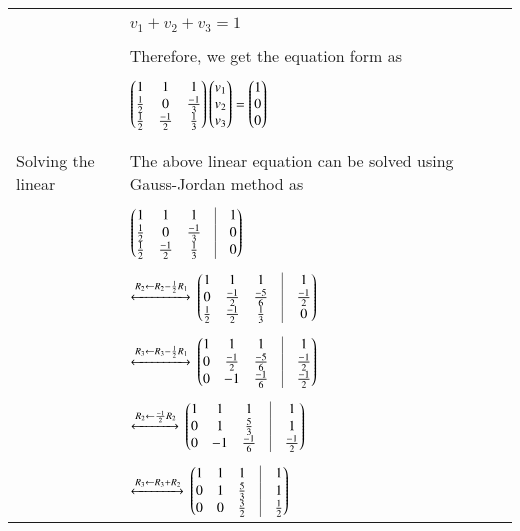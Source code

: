 \begin{longtable}{|l|l|}
		& \\
		& \qquad \qquad \qquad $v_{1}+v_{2}+v_{3} = 1$ \\
		& \\
		& Therefore, we get the equation form as \\
		& \\
		& \qquad \qquad \qquad $\begin{pmatrix}1&1&1\\\frac{1}{2}&0&\frac{-1}{3}\\\frac{1}{2}&\frac{-1}{2}&\frac{1}{3}\end{pmatrix}\begin{pmatrix}v_{1}\\v_{2}\\v_{3}\end{pmatrix} = \begin{pmatrix}1\\0\\0\end{pmatrix}$ \\
		& \\
		\hline
		\multirow{3}{*}{Solving the linear} & \\
		& The above linear equation can be solved using Gauss-Jordan method as\\equtions
		& \\
		& \qquad \qquad \qquad $\myvec{1&1&1&\vrule&1\\\frac{1}{2}&0&\frac{-1}{3}&\vrule&0\\\frac{1}{2}&\frac{-1}{2}&\frac{1}{3}&\vrule&0}$\\
		& \\
		& \qquad $\xleftrightarrow[]{R_2 \leftarrow R_2 - \frac{1}{2}R_1}$
		$\myvec{1&1&1&\vrule&1\\0&\frac{-1}{2}&\frac{-5}{6}&\vrule&\frac{-1}{2}\\\frac{1}{2}&\frac{-1}{2}&\frac{1}{3}&\vrule&0}$\\
		&\\
		& \qquad $\xleftrightarrow[]{R_3 \leftarrow R_3 - \frac{1}{2}R_1}$
		$\myvec{1&1&1&\vrule&1\\0&\frac{-1}{2}&\frac{-5}{6}&\vrule&\frac{-1}{2}\\0&-1&\frac{-1}{6}&\vrule&\frac{-1}{2}}$\\
		&\\
		& \qquad $\xleftrightarrow[]{R_2 \leftarrow \frac{-1}{2}R_2}$
		$\myvec{1&1&1&\vrule&1\\0&1&\frac{5}{3}&\vrule&1\\0&-1&\frac{-1}{6}&\vrule&\frac{-1}{2}}$\\
		&\\
		& \qquad $\xleftrightarrow[]{R_3 \leftarrow R_3 + R_2}$
		$\myvec{1&1&1&\vrule&1\\0&1&\frac{5}{3}&\vrule&1\\0&0&\frac{3}{2}&\vrule&\frac{1}{2}}$\\

\end{longtable}
